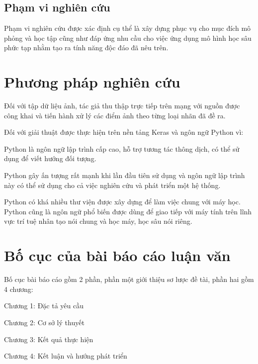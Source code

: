 \documentclass[../the.tex]{subfiles}
\begin{document}
\subsection{Phạm vi nghiên cứu}
{\fontsize{13}{12} \selectfont
Phạm vi nghiên cứu được xác định cụ thể là xây dựng phục vụ cho mục đích mô phỏng và học tập cũng như đáp ứng nhu cầu cho việc ứng dụng mô hình học sâu phức tạp nhằm tạo ra tính năng độc đáo đã nêu trên.}

\bigskip

\section{Phương pháp nghiên cứu}
{\fontsize{13}{12} \selectfont
 Đối với tập dữ liệu ảnh, tác giả thu thập trực tiếp trên mạng với nguồn được công khai và tiến hành xử lý các điểm ảnh theo từng loại nhãn đã đề ra.
\bigskip
 
 Đối với giải thuật được thực hiện trên nền tảng Keras và ngôn ngữ Python vì:
  
\begin{itemize}
    \begin{item}
		Python là ngôn ngữ lập trình cấp cao, hỗ trợ tương tác thông dịch, có thể sử dụng để viết hướng đối tượng.
    \end{item}
    \begin{item}
		Python gây ấn tượng rất mạnh khi lần đầu tiên sử dụng và ngôn ngữ lập trình này có thể sử dụng cho cả việc nghiên cứu và phát triển một hệ thống.
    \end{item}
    \begin{item}
		Python có khá nhiều thư viện được xây dựng để làm việc chung với máy học. Python cũng là ngôn ngữ phổ biến được dùng để giao tiếp với máy tính trên lĩnh vực trí tuệ nhân tạo nói chung và học máy, học sâu nói riêng.
    \end{item}
\end{itemize}}

\section{Bố cục của bài báo cáo luận văn}
{\fontsize{13}{12} \selectfont
Bố cục bài báo cáo gồm 2 phần, phần một giới thiệu sơ lược đề tài, phần hai gồm 4 chương:

	Chương 1: Đặc tả yêu cầu
	
	Chương 2: Cơ sở lý thuyết
	
	Chương 3: Kết quả thực hiện
	
	Chương 4: Kết luận và hướng phát triển}
	
\end{document}
